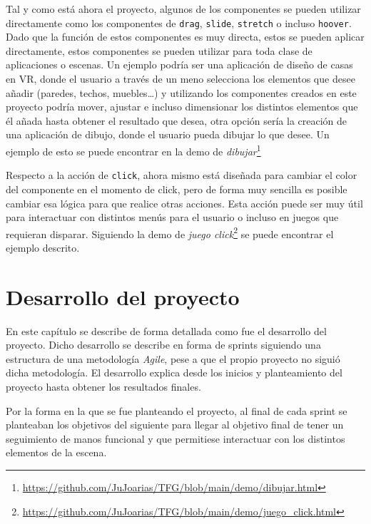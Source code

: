 \documentclass[a4paper, 12pt]{book}
\begin{document}
Tal y como está ahora el proyecto, algunos de los componentes se pueden utilizar directamente como los componentes de \texttt{drag}, \texttt{slide}, \texttt{stretch} o incluso \texttt{hoover}. Dado que la función de estos componentes es muy directa, estos se pueden aplicar directamente, estos componentes se pueden utilizar para toda clase de aplicaciones o escenas. Un ejemplo podría ser una aplicación de diseño de casas en VR,
donde el usuario a través de un meno selecciona los elementos que desee añadir (paredes, techos, muebles…) y utilizando los componentes creados en este proyecto podría mover, ajustar e incluso dimensionar los distintos elementos que él añada hasta obtener el resultado que desea, otra opción sería la creación de una aplicación de dibujo, donde el usuario pueda dibujar lo que desee. Un ejemplo de esto se puede encontrar en la demo de \textit{dibujar}\footnote{\url{https://github.com/JuJoarias/TFG/blob/main/demo/dibujar.html}} 

Respecto a la acción de \texttt{click}, ahora mismo está diseñada para cambiar el color del componente en el momento de click, pero de forma muy sencilla es posible cambiar esa lógica para que realice otras acciones. Esta acción puede ser muy útil para interactuar con distintos menús para el usuario o incluso en juegos que requieran disparar. Siguiendo la demo de \textit{juego click}\footnote{\url{https://github.com/JuJoarias/TFG/blob/main/demo/juego_click.html}} se puede encontrar el ejemplo descrito.

\cleardoublepage
\chapter{Desarrollo del proyecto}
\label{chap:Desarrollo del proyecto}
En este capítulo se describe de forma detallada como fue el desarrollo del proyecto. Dicho desarrollo
se describe en forma de sprints siguiendo una estructura de una metodología \textit{Agile}\cite{asana_agile_methodology}, pese a que el propio proyecto no siguió dicha metodología. 
El desarrollo explica desde los inicios y planteamiento del proyecto hasta obtener los resultados finales.

Por la forma en la que se fue planteando el proyecto, al final de cada sprint se planteaban los objetivos del siguiente para llegar al objetivo final de tener un seguimiento de manos funcional y que permitiese interactuar con los distintos elementos de la escena. 
\end{document}
